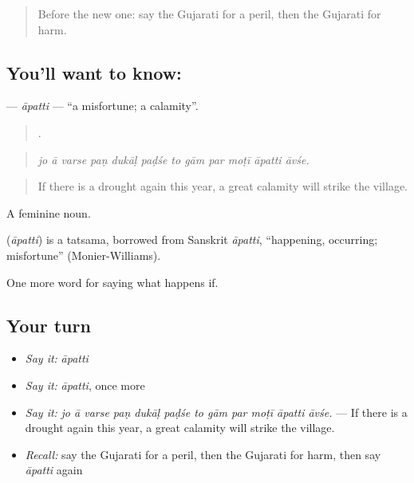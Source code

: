 \label{lesson:GU-C370-apatti}



\begin{quote}
Before the new one: say the Gujarati for a peril, then the Gujarati for harm.
\end{quote}

\subsection*{You'll want to know: }
\textbf{} — \emph{āpatti} — \textquotedblleft{}a misfortune; a calamity\textquotedblright{}.

\begin{quote}
           .
\end{quote}

\begin{quote}
\emph{jo ā varse paṇ dukāḷ paḍśe to gām par moṭī āpatti āvśe.}
\end{quote}

\begin{quote}
If there is a drought again this year, a great calamity will strike the village.
\end{quote}

A feminine noun.

\begin{cousinweb}
\textbf{} (\emph{āpatti}) is a tatsama, borrowed from Sanskrit \emph{āpatti}, \textquotedblleft{}happening, occurring; misfortune\textquotedblright{} (Monier-Williams).
\end{cousinweb}

\begin{grammarlens}[title={What you've built}]
One more word for saying what happens if.
\end{grammarlens}

\subsection*{Your turn}
\begin{itemize}
\raggedright
  \item \emph{Say it:} \emph{āpatti}
  \item \emph{Say it:} \emph{āpatti}, once more
  \item \emph{Say it:} \emph{jo ā varse paṇ dukāḷ paḍśe to gām par moṭī āpatti āvśe.} — If there is a drought again this year, a great calamity will strike the village.
  \item \emph{Recall:} say the Gujarati for a peril, then the Gujarati for harm, then say \emph{āpatti} again
\end{itemize}

